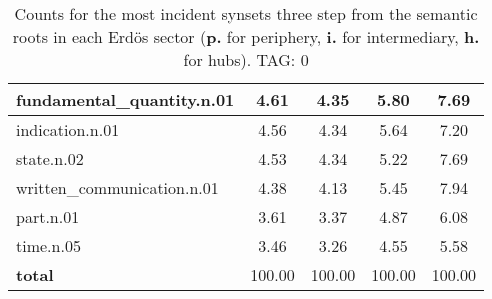 \begin{table}[h!]
\begin{center}
\begin{tabular}{| l || c | c | c | c |}
fundamental\_quantity.n.01 & 4.61  & 4.35  & 5.80  & 7.69 \\\hline
indication.n.01 & 4.56  & 4.34  & 5.64  & 7.20 \\\hline
state.n.02 & 4.53  & 4.34  & 5.22  & 7.69 \\\hline
written\_communication.n.01 & 4.38  & 4.13  & 5.45  & 7.94 \\\hline
part.n.01 & 3.61  & 3.37  & 4.87  & 6.08 \\\hline
time.n.05 & 3.46  & 3.26  & 4.55  & 5.58 \\\hline\hline
{{\bf total}} & 100.00  & 100.00  & 100.00  & 100.00 \\\hline
\end{tabular}
\caption{Counts for the most incident synsets three step from the semantic roots in each Erd\"os sector ({\bf p.} for periphery, {\bf i.} for intermediary, {\bf h.} for hubs). TAG: 0}
\end{center}
\end{table}